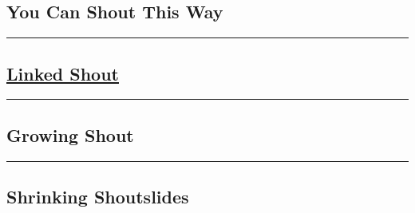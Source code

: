 \documentclass[]{article}
\begin{document}
\subsection{You Can Shout This Way}\label{you-can-shout-this-way}

\begin{center}\rule{3in}{0.4pt}\end{center}

\subsection{\href{}{Linked Shout}}\label{linked-shout}

\begin{center}\rule{3in}{0.4pt}\end{center}

\subsection{Growing Shout}\label{growing-shout}

\begin{center}\rule{3in}{0.4pt}\end{center}

\subsection{Shrinking Shoutslides}\label{shrinking-shoutslides}
\end{document}
